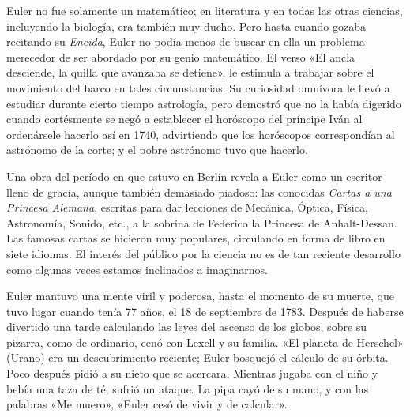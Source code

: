 \documentclass[a4paper, 12pt]{article}
\begin{document}
Euler no fue solamente un matemático; en literatura y en todas las otras ciencias, incluyendo la biología, era también muy ducho. Pero hasta cuando gozaba recitando su {\it Eneida}, Euler no podía menos de buscar en ella un problema merecedor de ser abordado por su genio matemático. El verso «El ancla desciende, la quilla que avanzaba se detiene», le estimula a trabajar sobre el movimiento del barco en tales circunstancias. Su curiosidad omnívora le llevó a estudiar durante cierto tiempo astrología, pero demostró que no la había digerido cuando cortésmente se negó a establecer el horóscopo del príncipe Iván al ordenársele hacerlo así en 1740, advirtiendo que los horóscopos correspondían al astrónomo de la corte; y el pobre astrónomo tuvo que hacerlo.

Una obra del período en que estuvo en Berlín revela a Euler como un escritor lleno de gracia, aunque también demasiado piadoso: las conocidas {\it Cartas a una Princesa Alemana}, escritas para dar lecciones de Mecánica, Óptica, Física, Astronomía, Sonido, etc., a la sobrina de Federico la Princesa de Anhalt-Dessau. Las famosas cartas se hicieron muy populares, circulando en forma de libro en siete idiomas. El interés del público por la ciencia no es de tan reciente desarrollo como algunas veces estamos inclinados a imaginarnos.

Euler mantuvo una mente viril y poderosa, hasta el momento de su muerte, que tuvo lugar cuando tenía 77 años, el 18 de septiembre de 1783. Después de haberse divertido una tarde calculando las leyes del ascenso de los globos, sobre su pizarra, como de ordinario, cenó con Lexell y su familia. «El planeta de Herschel» (Urano) era un descubrimiento reciente; Euler bosquejó el cálculo de su órbita. Poco después pidió a su nieto que se acercara. Mientras jugaba con el niño y bebía una taza de té, sufrió un ataque. La pipa cayó de su mano, y con las palabras «Me muero», «Euler cesó de vivir y de calcular».
\end{document}
